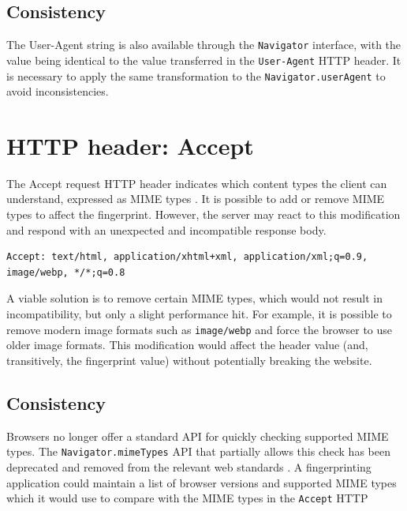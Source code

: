 \subsection{Consistency}

The User-Agent string is also available through the \texttt{Navigator} interface, with the value being identical to the value transferred in the \texttt{User-Agent} HTTP header. It is necessary to apply the same transformation to the \texttt{Navigator.userAgent} to avoid inconsistencies.

\section{HTTP header: Accept}
\label{SectionHTTPHeaderAccept}

The Accept request HTTP header indicates which content types the client can understand, expressed as MIME types \cite{MDNHeaderAccept}. It is possible to add or remove MIME types to affect the fingerprint. However, the server may react to this modification and respond with an unexpected and incompatible response body.

\bigbreak

\begin{lstlisting}[caption={An example of Accept header contents \cite{MDNHeaderAccept}.}]
Accept: text/html, application/xhtml+xml, application/xml;q=0.9, image/webp, */*;q=0.8
\end{lstlisting}

\medbreak

A viable solution is to remove certain MIME types, which would not result in incompatibility, but only a slight performance hit. For example, it is possible to remove modern image formats such as \texttt{image/webp} and force the browser to use older image formats. This modification would affect the header value (and, transitively, the fingerprint value) without potentially breaking the website.

\subsection{Consistency}

Browsers no longer offer a standard API for quickly checking supported MIME types. The \texttt{Navigator.mimeTypes} API that partially allows this check has been deprecated and removed from the relevant web standards \cite{MDNNavigatorInterface}. A fingerprinting application could maintain a list of browser versions and supported MIME types which it would use to compare with the MIME types in the \texttt{Accept} HTTP 

